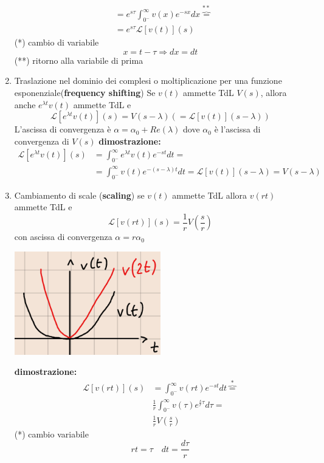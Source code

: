 \documentclass[a4paper, 12pt]{book}
\theoremstyle{plain}
\begin{document}
\begin{enumerate}
\[\begin{split}
            &= e^{s\tau} \int_{0^-}^\infty v(x) e^{-sx} dx \overbrace{=}^{**} \\
            &= e^{s \tau} \mathcal{L} [v(t)] (s)
        \end{split}
    \]
    (*) cambio di variabile \[x = t - \tau \Rightarrow dx = dt\]
    (**) ritorno alla variabile di prima
    \item Traslazione nel dominio dei complesi o moltiplicazione per una funzione esponenziale(\textbf{frequency shifting})
    Se $v(t)$ ammette TdL $V(s)$, allora anche $e^{\lambda t}v(t)$ ammette TdL e 
    \[
        \mathcal{L} [e^{\lambda t} v(t)] (s) = V(s - \lambda) (= \mathcal{L} [v(t)] (s- \lambda))
    \]
    L'ascissa di convergenza è $\alpha = \alpha_0 + Re(\lambda)$ dove $\alpha_0$ è l'ascissa di convergenza di $V(s)$ \textbf{dimostrazione:}
    \[
        \begin{split}
            \mathcal{L} [e^{\lambda t} v(t)] (s) &= \int_{0^-}^\infty e^{\lambda t} v(t) e^{-st} dt = \\
            &= \int_{0^-}^\infty v(t) e^{-(s - \lambda)t} dt = \mathcal{L} [v(t)] (s - \lambda) = V(s - \lambda)
        \end{split}
    \]
    \item Cambiamento di scale (\textbf{scaling}) se $v(t)$ ammette TdL allora $v(rt)$ ammette TdL e 
    \[
        \mathcal{L} [v(rt)] (s) = \frac{1}{r} V(\frac{s}{r})
    \]
    con ascissa di convergenza $\alpha = r \alpha_0$
    \begin{center}
        \includegraphics[width=0.5\textwidth]{RdC4.png}
    \end{center}
    \textbf{dimostrazione:}
    \[
        \begin{split}
            \mathcal{L} [v(rt)] (s) &= \int_{0^-}^\infty v(rt) e^{-st} dt \overbrace{=}^* \\
            & \frac{1}{r} \int_{0^-}^\infty v(\tau) e^{\frac{s}{r} \tau} d \tau = \\
            &\frac{1}{r} V(\frac{s}{r})
        \end{split}
    \]
    (*) cambio variabile \[ rt = \tau \quad dt = \frac{d\tau}{r}\]
\end{enumerate}
\end{document}
